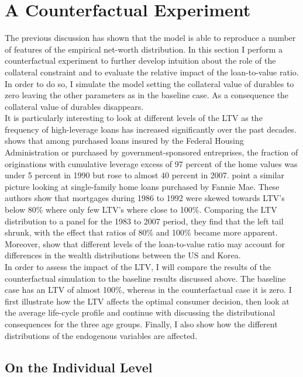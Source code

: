\documentclass[a4paper,12pt,legno]{article}
\begin{document}
\section{A Counterfactual Experiment}
\label{counterfactual}
The previous discussion has shown that the model is able to reproduce a number of features of the empirical net-worth distribution. In this section I perform a counterfactual experiment to further develop intuition about the role of the collateral constraint and to evaluate the relative impact of the loan-to-value ratio. In order to do so, I simulate the model setting the collateral value of durables to zero leaving the other parameters as in the baseline case. As a consequence the collateral value of durables disappears.\\
It is particularly interesting to look at different levels of the LTV as the frequency of high-leverage loans has increased significantly over the past decades. \cite{pinto2010government} shows that among purchased loans insured by the Federal Housing Administration or purchased by government-sponsored entreprises, the fraction of originations with cumulative leverage excess of 97 percent of the home values was under 5 percent in 1990 but rose to almost 40 percent in 2007. \cite{bokhari2013did} point a similar picture looking at single-family home loans purchased by Fannie Mae. These authors show that mortgages during 1986 to 1992 were skewed towards LTV's below 80\% where only few LTV's where close to 100\%. Comparing the LTV distribution to a panel for the 1983 to 2007 period, they find that the left tail shrunk, with the effect that ratios of 80\% and 100\% became more apparent. Moreover, \cite{cho2012accounting} show that different levels of the loan-to-value ratio  may account for differences in the wealth distributions between the US and Korea.\\
In order to assess the impact of the LTV, I will compare the results of the counterfactual simulation to the baseline results discussed above. The baseline case has an LTV of almost 100\%, whereas in the counterfactual case it is zero. I first illustrate how the LTV affects the optimal consumer decision, then look at the average life-cycle profile and continue with discussing the distributional consequences for the three age groups. Finally, I also show how the different distributions of the endogenous variables are affected. 

\subsection{On the Individual Level}
\end{document}

